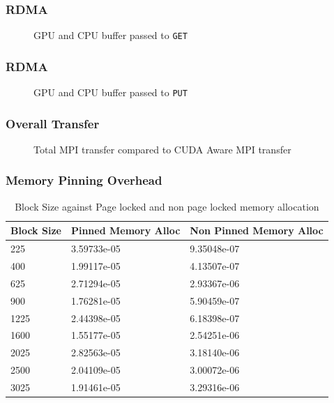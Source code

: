 \documentclass{beamer}
\begin{document}
\begin{frame}[fragile]
  \frametitle{RDMA}
  \pause
  \begin{figure}[h]
    \resizebox{.9\linewidth}{!}{}
    \caption{GPU and CPU buffer passed to \texttt{GET}}
  \end{figure}
\end{frame}

\begin{frame}[fragile]
  \frametitle{RDMA}
  \pause
  \begin{figure}[h]
    \resizebox{.9\linewidth}{!}{}
    \caption{GPU and CPU buffer passed to \texttt{PUT}}
  \end{figure}
\end{frame}

\begin{frame}[fragile]
  \frametitle{Overall Transfer}
  \pause
  \begin{figure}[h]
    \resizebox{.9\linewidth}{!}{}
    \caption{Total MPI transfer compared to CUDA Aware MPI transfer}
  \end{figure}
\end{frame}
\begin{frame}[fragile]
  \frametitle{Memory Pinning Overhead}
  \begin{table}[h]
    \centering
    \begin{tabular}{l<{\onslide<2->} | l<{\onslide<3->} | l<{\onslide}}
      \hline
      Block Size & Pinned Memory Alloc & Non Pinned Memory Alloc \\
      \hline
      225        & 3.59733e-05         & 9.35048e-07             \\
      400        & 1.99117e-05         & 4.13507e-07             \\
      625        & 2.71294e-05         & 2.93367e-06             \\
      900        & 1.76281e-05         & 5.90459e-07             \\
      1225       & 2.44398e-05         & 6.18398e-07             \\
      1600       & 1.55177e-05         & 2.54251e-06             \\
      2025       & 2.82563e-05         & 3.18140e-06             \\
      2500       & 2.04109e-05         & 3.00072e-06             \\
      3025       & 1.91461e-05         & 3.29316e-06             \\
      \hline
    \end{tabular}
    \caption{Block Size against Page locked and non page locked memory allocation}
  \end{table}
\end{frame}
\end{document}
